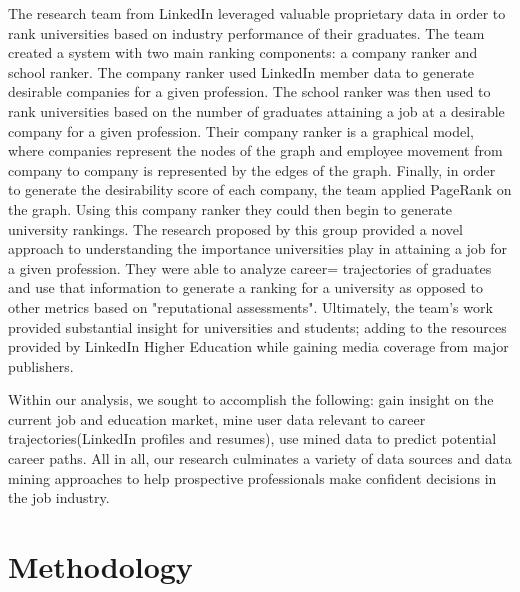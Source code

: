 The research team from LinkedIn \cite{kapur2016} leveraged valuable proprietary data in order to rank universities based on industry performance of their graduates. The team created a system with two main ranking components: a company ranker and school ranker. The company ranker used LinkedIn member data to generate desirable companies for a given profession. The school ranker was then used to rank universities based on the number of graduates attaining a job at a desirable company for a given profession. Their company ranker is a graphical model, where companies represent the nodes of the graph and employee movement from company to company is represented by the edges of the graph. Finally, in order to generate the desirability score of each company, the team applied PageRank on the graph. Using this company ranker they could then begin to generate university rankings. The research proposed by this group provided a novel approach to understanding the importance universities play in attaining a job for a given profession. They were able to analyze career= trajectories of graduates and use that information to generate a ranking for a university as opposed to other metrics based on "reputational assessments". Ultimately, the team's work provided substantial insight for universities and students; adding to the resources provided by LinkedIn Higher Education while gaining media coverage from major publishers.

Within our analysis, we sought to accomplish the following: gain insight on the current job and education market, mine user data relevant to career trajectories(LinkedIn profiles and resumes), use mined data to predict potential career paths. All in all, our research culminates a variety of data sources and data mining approaches to help prospective professionals make confident decisions in the job industry. 
\section{Methodology}
